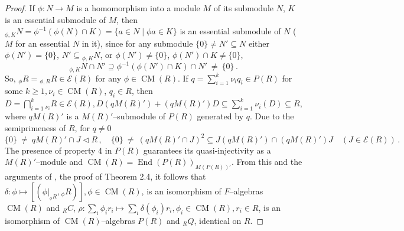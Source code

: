 \documentclass[a4paper,11pt]{article}
\DeclareMathOperator{\End}{End}
\DeclareMathOperator{\CM}{CM}
\begin{document}
\begin{proof}
If ${\phi: N\longrightarrow M}$ is a homomorphism into a module $M$ of its 
submodule $N$, $K$ is an essential submodule of $M$, then 
${{}_{\phi, K} N=\phi^{-1}(\phi(N)\cap K)=\{a\in N\mid \phi a\in K\}}$
is an essential submodule of $N$ ($M$ for an essential $N$ in it), since for 
any submodule ${\{0\}\ne N'\subseteq N}$ either 
${\phi(N')=\{0\}}$, ${N'\subseteq {}_{\phi, K} N}$, or ${\phi(N')\ne \{0\}}$, 
${\phi(N')\cap K\ne \{0\}}$,
\[
{}_{\phi, K} N\cap N'\supseteq \phi^{-1}(\phi(N')\cap K)\cap N'\ \ne\ \{0\}\,.
\]
So, ${{}_{\phi} R={}_{\phi, R} R\in \mathcal{E}(R)}$ for any ${\phi\in \CM(R)}$. 
If ${q=\sum\limits_{i=1}^k \nu_i q_i\in P(R)}$ for some 
${k\geq 1, \nu_i\in \CM(R)}$, ${q_i\in R}$, then 
${D=\bigcap\limits_{i=1}^k {}_{\nu_i} R\in \mathcal{E}(R), 
D (q M(R)')+(q M(R)') D\subseteq \sum\limits_{i=1}^k \nu_i(D)\subseteq R}$,
where $q M(R)'$ is a $M(R)'$--submodule of $P(R)$ generated by $q$. Due to 
the semiprimeness of $R$, for ${q\ne 0}$ 
\[
\{0\}\ \ne\ q M(R)'\cap J\lhd R\,,\quad 
\{0\}\ \ne\ (q M(R)'\cap J)^2\subseteq J (q M(R)')\cap (q M(R)') J
\quad (J\in \mathcal{E}(R))\,.
\]
The presence of property 4 in $P(R)$ guarantees its quasi-injectivity as 
a $M(R)'$--module and ${\CM(R)=\End(P(R))_{M(P(R))'}}$.
From this and the arguments of \cite{Cab3}, the proof of Theorem 2.4, it 
follows that 
${\delta: \phi\longmapsto [(\phi|_{{}_{\phi} R}, {}_{\phi} R)], 
\phi\in \CM(R)}$,
is an isomorphism of $F$--algebras $\CM(R)$ and ${}_R C$, 
${\rho: \sum\limits_i \phi_i r_i\longmapsto 
\sum\limits_i \delta(\phi_i) r_i, \phi_i\in \CM(R), r_i\in R}$, is an 
isomorphism of $\CM(R)$--algebras $P(R)$ and ${}_R Q$, identical on $R$.


\end{proof}
\end{document}
